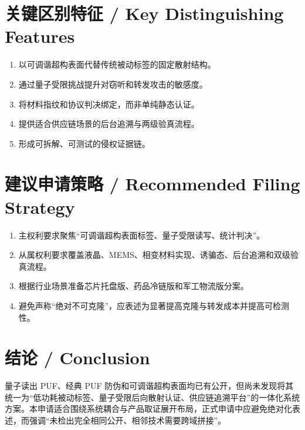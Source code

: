 ﻿\documentclass[12pt,a4paper]{article}
\begin{document}
\section{关键区别特征 / Key Distinguishing Features}
\begin{enumerate}
\item 以可调谐超构表面代替传统被动标签的固定散射结构。
\item 通过量子受限挑战提升对窃听和转发攻击的敏感度。
\item 将材料指纹和协议判决绑定，而非单纯静态认证。
\item 提供适合供应链场景的后台追溯与两级验真流程。
\item 形成可拆解、可测试的侵权证据链。
\end{enumerate}

\section{建议申请策略 / Recommended Filing Strategy}
\begin{enumerate}
\item 主权利要求聚焦“可调谐超构表面标签、量子受限读写、统计判决”。
\item 从属权利要求覆盖液晶、MEMS、相变材料实现、诱骗态、后台追溯和双级验真流程。
\item 根据行业场景准备芯片托盘版、药品冷链版和军工物流版分案。
\item 避免声称“绝对不可克隆”，应表述为显著提高克隆与转发成本并提高可检测性。
\end{enumerate}

\section{结论 / Conclusion}
量子读出 PUF、经典 PUF 防伪和可调谐超构表面均已有公开，但尚未发现将其统一为“低功耗被动标签、量子受限后向散射认证、供应链追溯平台”的一体化系统方案。本申请适合围绕系统耦合与产品取证展开布局，正式申请中应避免绝对化表述，而强调“未检出完全相同公开、相邻技术需要跨域拼接”。
\end{document}
